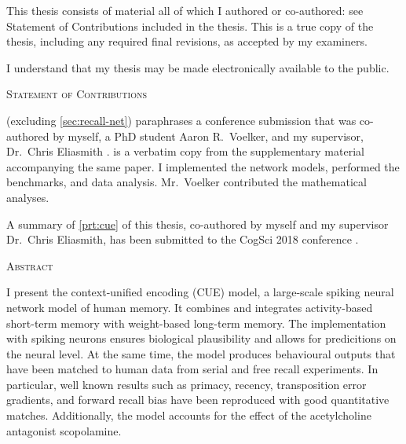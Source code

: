   \noindent
  This thesis consists of material all of which I authored or co-authored: see Statement of Contributions included in the thesis.
  This is a true copy of the thesis, including any required final revisions, as accepted by my examiners.

  \bigskip
  
  \noindent
I understand that my thesis may be made electronically available to the public.

\cleardoublepage

\begin{center}\textsc{Statement of Contributions}\end{center}
 (excluding \cref{sec:recall-net}) paraphrases a conference submission that was co-authored by myself, a PhD student Aaron R.\ Voelker, and my supervisor, Dr.\ Chris Eliasmith \parencite{jangosmann2017}.
 is a verbatim copy from the supplementary material accompanying the same paper.
I implemented the network models, performed the benchmarks, and data analysis.
Mr.~Voelker contributed the mathematical analyses.

A summary of \cref{prt:cue} of this thesis, co-authored by myself and my supervisor Dr.\ Chris Eliasmith, has been submitted to the CogSci 2018 conference \parencite{gosmann2018}.

\cleardoublepage


\begin{center}\textsc{Abstract}\end{center}
I present the context-unified encoding (CUE) model, a large-scale spiking neural network model of human memory.
It combines and integrates activity-based short-term memory with weight-based long-term memory.
The implementation with spiking neurons ensures biological plausibility and allows for predicitions on the neural level.
At the same time, the model produces behavioural outputs that have been matched to human data from serial and free recall experiments.
In particular, well known results such as primacy, recency, transposition error gradients, and forward recall bias have been reproduced with good quantitative matches.
Additionally, the model accounts for the effect of the acetylcholine antagonist scopolamine.

